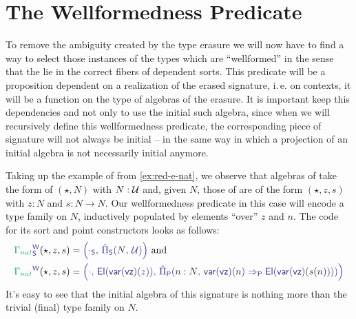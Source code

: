 \section{The Wellformedness Predicate}

To remove the ambiguity created by the type erasure we will now have to find
a way to select those instances of the types which are ``wellformed'' in the
sense that the lie in the correct fibers of dependent sorts.
This predicate will be a proposition dependent on a realization of the erased
signature, i.\,e. on contexts, it will be a function on the type of algebras
of the erasure.
It is important keep this dependencies and not only to use the initial such
algebra, since when we will recursively define this wellformedness predicate,
the corresponding piece of signature will not always be initial
-- in the same way in which a projection of an initial algebra is not necessarily
initial anymore.

\begin{example}\label{ex:red-w-nat}
Taking up the example of  from \ref{ex:red-e-nat},
we observe that algebras of  take the form of
$(\star, N)$ with $N : \mathcal{U}$ and, given $N$, those of
 are of the form $(\star, z, s)$ with
$z : N$ and $s : N \to N$.
Our wellformedness predicate in this case will encode a type family on $N$, inductively
populated by elements ``over'' $z$ and $n$.
The code for its sort and point constructors looks as follows:
\begin{align*}
\tqm{\grm{\Gamma_{nat}}^\WW_\Sc}(\star, z, s)
  &= \tqm{\left( \cdot_\Sc,\, \ExtPiS{N}{\UU} \right)} \text{ and} \\
\tqm{\grm{\Gamma_{nat}}^\WW}(\star, z, s)
  &= \tqm{\left( \cdot,\,  \El(\var(\vz)(\blm{z})),\,
    \ExtPiP{n : N}{\var(\vz)(\blm{n}) \Rightarrow_\Pc \El(\var(\vz)(\blm{s(n)}))} \right)}
\end{align*} %
It's easy to see that the initial algebra of this signature is nothing more than
the trivial (final) type family on $N$.
\end{example}


